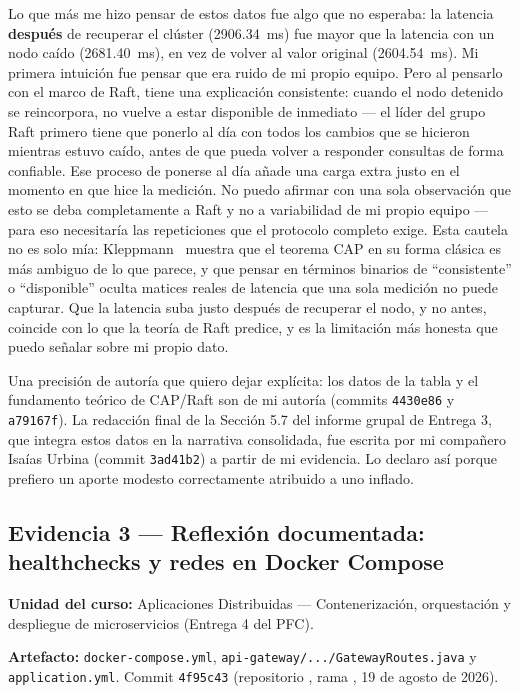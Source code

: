 \documentclass[10pt,journal,a4paper]{IEEEtran}
\begin{document}
Lo que más me hizo pensar de estos datos fue algo que no esperaba: la latencia
\textbf{después} de recuperar el clúster (2906.34~ms) fue mayor que la
latencia con un nodo caído (2681.40~ms), en vez de volver al valor original
(2604.54~ms). Mi primera intuición fue pensar que era ruido de mi propio
equipo. Pero al pensarlo con el marco de Raft, tiene una explicación
consistente: cuando el nodo detenido se reincorpora, no vuelve a estar
disponible de inmediato --- el líder del grupo Raft primero tiene que ponerlo
al día con todos los cambios que se hicieron mientras estuvo caído, antes de
que pueda volver a responder consultas de forma confiable. Ese proceso de
ponerse al día añade una carga extra justo en el momento en que hice la
medición. No puedo afirmar con una sola observación que esto se deba
completamente a Raft y no a variabilidad de mi propio equipo --- para eso
necesitaría las repeticiones que el protocolo completo exige. Esta cautela no
es solo mía: Kleppmann~\cite{kleppmann2015} muestra que el teorema CAP en su
forma clásica es más ambiguo de lo que parece, y que pensar en términos
binarios de ``consistente'' o ``disponible'' oculta matices reales de latencia
que una sola medición no puede capturar. Que la latencia suba justo después
de recuperar el nodo, y no antes, coincide con lo que la teoría de Raft
predice, y es la limitación más honesta que puedo señalar sobre mi propio
dato.

Una precisión de autoría que quiero dejar explícita: los datos de la tabla y
el fundamento teórico de CAP/Raft son de mi autoría (commits \texttt{4430e86}
y \texttt{a79167f}). La redacción final de la Sección 5.7 del informe grupal
de Entrega 3, que integra estos datos en la narrativa consolidada, fue escrita
por mi compañero Isaías Urbina (commit \texttt{3ad41b2}) a partir de mi
evidencia. Lo declaro así porque prefiero un aporte modesto correctamente
atribuido a uno inflado.

\subsection{Evidencia 3 --- Reflexión documentada: healthchecks y redes en Docker Compose}

\textbf{Unidad del curso:} Aplicaciones Distribuidas --- Contenerización,
orquestación y despliegue de microservicios (Entrega 4 del PFC).

\textbf{Artefacto:} \texttt{docker-compose.yml},
\texttt{api-gateway/.../GatewayRoutes.java} y \texttt{application.yml}.
Commit \texttt{4f95c43} (repositorio , rama
, 19 de agosto de 2026).
\end{document}
